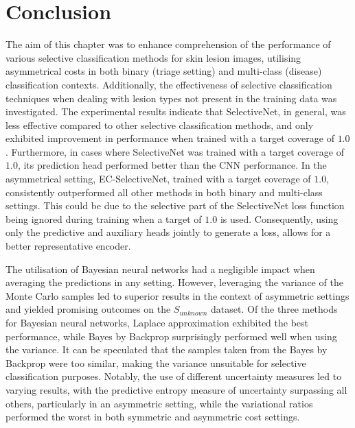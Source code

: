 \section{Conclusion}
\label{sec:selective_conclusion}
The aim of this chapter was to enhance comprehension of the performance of various selective classification methods for skin lesion images, utilising asymmetrical costs in both binary (triage setting) and multi-class (disease) classification contexts. Additionally, the effectiveness of selective classification techniques when dealing with lesion types not present in the training data was investigated. The experimental results indicate that SelectiveNet, in general, was less effective compared to other selective classification methods, and only exhibited improvement in performance when trained with a target coverage of $1.0$. Furthermore, in cases where SelectiveNet was trained with a target coverage of $1.0$, its prediction head performed better than the CNN performance. In the asymmetrical setting, EC-SelectiveNet, trained with a target coverage of $1.0$, consistently outperformed all other methods in both binary and multi-class settings. This could be due to the selective part of the SelectiveNet loss function being ignored during training when a target of $1.0$ is used. Consequently, using only the predictive and auxiliary heads jointly to generate a loss, allows for a better representative encoder.

The utilisation of Bayesian neural networks had a negligible impact when averaging the predictions in any setting. However, leveraging the variance of the Monte Carlo samples led to superior results in the context of asymmetric settings and yielded promising outcomes on the $S_{unknown}$ dataset. Of the three methods for Bayesian neural networks, Laplace approximation exhibited the best performance, while Bayes by Backprop surprisingly performed well when using the variance. It can be speculated that the samples taken from the Bayes by Backprop were too similar, making the variance unsuitable for selective classification purposes. Notably, the use of different uncertainty measures led to varying results, with the predictive entropy measure of uncertainty surpassing all others, particularly in an asymmetric setting, while the variational ratios performed the worst in both symmetric and asymmetric cost settings.

